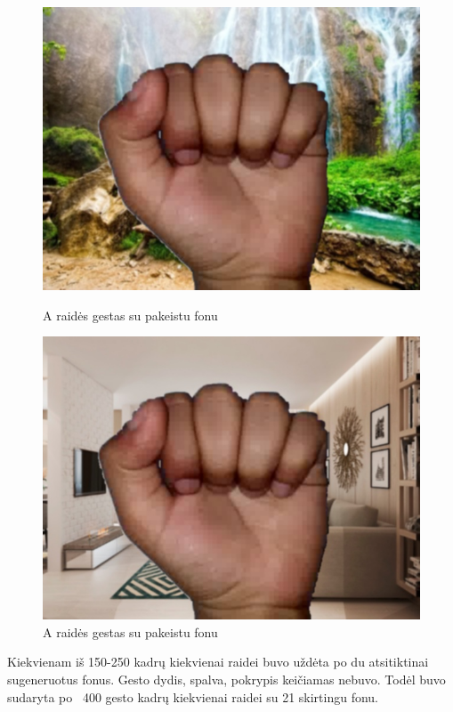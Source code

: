 \documentclass{VUMIFInfKursinis}
\begin{document}
\begin{figure}[H]
	\begin{minipage}{.5\textwidth}
		\centering
		\includegraphics[width=.8\linewidth]{img/A1}
		\caption{A raidės gestas su pakeistu fonu}
		\label{img:a-sign-first}
	\end{minipage}\hspace{\fill}%
	\begin{minipage}{.5\textwidth}
		\centering
		\includegraphics[width=.8\linewidth]{img/A2}
		\caption{A raidės gestas su pakeistu fonu}
		\label{img:a-sign-second}
	\end{minipage}\hspace{\fill}%
\end{figure}

Kiekvienam iš 150-250 kadrų kiekvienai raidei buvo uždėta po du atsitiktinai sugeneruotus fonus. Gesto dydis, spalva, pokrypis keičiamas nebuvo. Todėl buvo sudaryta po ~400 gesto kadrų kiekvienai raidei su 21 skirtingu fonu.
\end{document}
